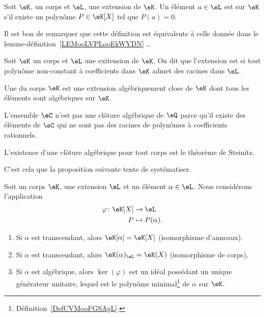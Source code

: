 \begin{definition}      \label{DEFooAONVooDAzMcC}
    Soit \( \eK\), un corps et \( \eL\), une extension de \( \eK\). Un élément \( a\in \eL\) est  sur \( \eK\) s'il existe un polynôme \( P\in \eK[X]\) tel que \( P(a)=0\).
\end{definition}

Il est bon de remarquer que cette définition est équivalente à celle donnée dans le lemme-définition~\ref{LEMooLVPLooEkWYDN} \dots

\begin{definition}
    Soit \( \eK\) un corps et \( \eL \) une exitension de \( \eK \). On dit que l'extension est  si tout polynôme non-constant à coefficients dans \( \eK\) admet des racines dans \( \eL \).
\end{definition}

\begin{definition}
    Une  du corps \( \eK\) est une extension algébriquement close de \( \eK\) dont tous les éléments sont algébriques sur \( \eK\).
\end{definition}

\begin{remark}      \label{REMooSPBBooIHHMrG}
    L'ensemble \( \eC\) n'est pas une clôture algébrique de \( \eQ\) parce qu'il existe des éléments de \( \eC\) qui ne sont pas des racines de polynômes à coefficients rationnels.
\end{remark}
L'existence d'une clôture algébrique pour tout corps est le théorème de Steinitz.

C'est cela que la proposition suivante tente de systématiser.
\begin{proposition}     \label{PROPooSYQWooFbfQtm}
    Soit un corps \( \eK\), une extension \( \eL\) et un élément \( \alpha\in \eL\). Nous considérons l'application
    \begin{equation}
        \begin{aligned}
            \varphi\colon \eK[X]&\to \eL \\
            P&\mapsto P(\alpha).
        \end{aligned}
    \end{equation}
    \begin{enumerate}
        \item       \label{ITEMooUZDQooOasiRQ}
            Si \( \alpha\) est transcendant, alors \( \eK[\alpha]=\eK[X]\) (isomorphisme d'anneaux).
        \item
            Si \( \alpha\) est transcendant, alors \( \eK(\alpha)_{\eL}=\eK(X)\) (isomorphisme de corps),
        \item
            Si \( \alpha\) est algébrique, alors \( \ker(\varphi)\) est un idéal possédant un unique générateur unitaire, lequel est le polynôme minimal\footnote{Définition~\ref{DefCVMooFGSAgL}.} de \( \alpha\) sur \( \eK\).
    \end{enumerate}
\end{proposition}

